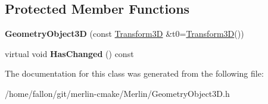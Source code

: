 \subsection*{Protected Member Functions}
\begin{DoxyCompactItemize}
\item 
\mbox{\label{classGeometryObject3D_a70a7a3c9b7d057738f8fd457296632c1}} 
{\bfseries Geometry\+Object3D} (const \hyperlink{classTransform3D}{Transform3D} \&t0=\hyperlink{classTransform3D}{Transform3D}())
\item 
\mbox{\label{classGeometryObject3D_a3e50dca00ed7fef0b31bbbd492085b1e}} 
virtual void {\bfseries Has\+Changed} () const
\end{DoxyCompactItemize}


The documentation for this class was generated from the following file\+:\begin{DoxyCompactItemize}
\item 
/home/fallon/git/merlin-\/cmake/\+Merlin/Geometry\+Object3\+D.\+h\end{DoxyCompactItemize}
